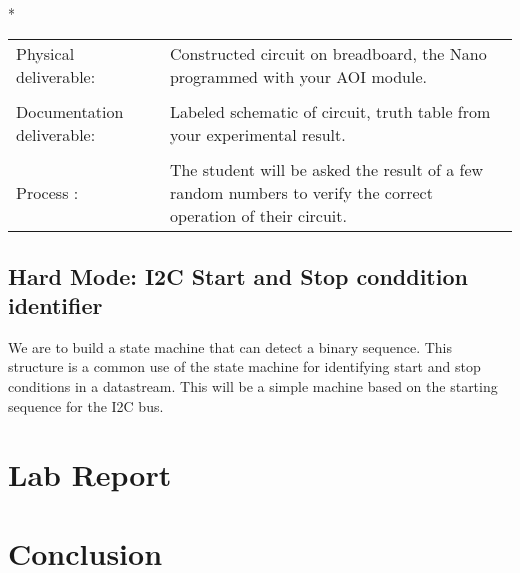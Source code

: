   \vspace{15px}
  \begin{centering}
    \begin{fminipage}{.43\textwidth}
      \vspace{3px}
      \\*
      \vspace{10px}
      \begin{tabular}{p{1.8cm}  p{5.4cm}}
        \raggedright Physical deliverable:                         &Constructed circuit on breadboard,  the Nano programmed with your AOI module.\\
        \\
        \raggedright Documentation deliverable:          & Labeled schematic of circuit,  truth table from your  experimental result.\\
        \\
        Process :                                                                            &The student will be asked the result of a few random numbers to verify the correct operation of their circuit.
      \end{tabular}
    \end{fminipage}
  \end{centering} 

  \subsection{Hard Mode: I2C Start and Stop conddition identifier}
    We are to build a state machine that can detect a binary sequence. This structure is a common use of the state machine for identifying start and stop conditions in a datastream. This will be a simple machine based on the starting sequence for the I2C bus.
\section{ Lab Report}
  

\section{ Conclusion}
 


